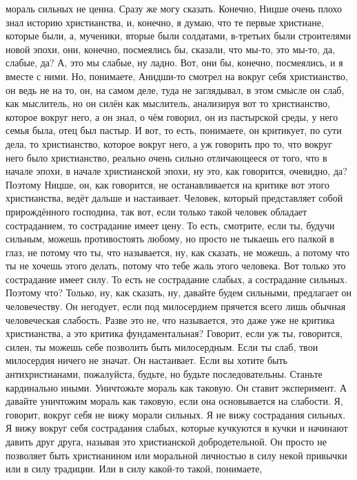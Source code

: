 мораль сильных не ценна. Сразу же могу сказать. Конечно, Ницше очень плохо знал
историю христианства, и, конечно, я думаю, что те первые христиане, которые
были, а, мученики, вторые были солдатами, в-третьих были строителями новой
эпохи, они, конечно, посмеялись бы, сказали, что мы-то, это мы-то, да, слабые,
да? А, это мы слабые, ну ладно. Вот, они бы, конечно, посмеялись, и я вместе с
ними. Но, понимаете, Анидши-то смотрел на вокруг себя христианство, он ведь не
на то, он, на самом деле, туда не заглядывал, в этом смысле он слаб, как
мыслитель, но он силён как мыслитель, анализируя вот то христианство, которое
вокруг него, а он знал, о чём говорил, он из пастырской среды, у него семья
была, отец был пастыр. И вот, то есть, понимаете, он критикует, по сути дела, то
христианство, которое вокруг него, а уж говорить про то, что вокруг него было
христианство, реально очень сильно отличающееся от того, что в начале эпохи, в
начале христианской эпохи, ну это, как говорится, очевидно, да? Поэтому Ницше,
он, как говорится, не останавливается на критике вот этого христианства, ведёт
дальше и настаивает. Человек, который представляет собой прирождённого
господина, так вот, если только такой человек обладает состраданием, то
сострадание имеет цену. То есть, смотрите, если ты, будучи сильным, можешь
противостоять любому, но просто не тыкаешь его палкой в глаз, не потому что ты,
что называется, ну, как сказать, не можешь, а потому что ты не хочешь этого
делать, потому что тебе жаль этого человека. Вот только это сострадание имеет
силу. То есть не сострадание слабых, а сострадание сильных. Поэтому что? Только,
ну, как сказать, ну, давайте будем сильными, предлагает он человечеству. Он
негодует, если под милосердием прячется всего лишь обычная человеческая
слабость. Разве это не, что называется, это даже уже не критика христианства, а
это критика фундаментальная? Говорит, если уж ты, говорится, силен, ты можешь
себе позволить быть милосердным. Если ты слаб, твои милосердия ничего не значат.
Он настаивает. Если вы хотите быть антихристианами, пожалуйста, будьте, но
будьте последовательны. Станьте кардинально иными. Уничтожьте мораль как
таковую. Он ставит эксперимент. А давайте уничтожим мораль как таковую, если она
основывается на слабости. Я, говорит, вокруг себя не вижу морали сильных. Я не
вижу сострадания сильных. Я вижу вокруг себя сострадания слабых, которые
кучкуются в кучки и начинают давить друг друга, называя это христианской
добродетельной. Он просто не позволяет быть христианином или моральной личностью
в силу некой привычки или в силу традиции. Или в силу какой-то такой, понимаете,
